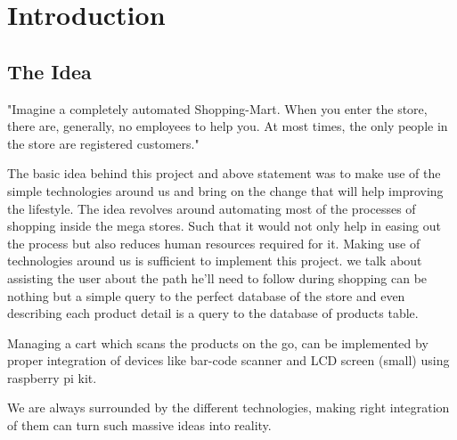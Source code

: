 \documentclass[a4paper,oneside,11pt,english]{report}
\begin{document}
\restoregeometry
\doublespacing

\tableofcontents
\listoffigures
\clearpage

\chapter{Introduction}
\section{The Idea}
{

	"Imagine a completely automated Shopping-Mart. When you enter the store, there are, generally, no employees to help you. At most times, the only people in the store are registered customers."
	\par The basic idea behind this project and above statement was to make use of the simple technologies around us and bring on the change that will help improving the lifestyle. The idea revolves around automating most of the processes of shopping inside the mega stores. Such that it would not only help in easing out the process but also reduces human resources required for it. Making use of technologies around us is sufficient to implement this project. we talk about assisting the user about the path he'll need to follow during shopping can be nothing but a simple query to the perfect database of the store and even describing each product detail is a query to the database of products table.

	\par Managing a cart which scans the products on the go, can be implemented by proper integration of devices like bar-code scanner and LCD screen (small) using raspberry pi kit.

	\par We are always surrounded by the different technologies, making right integration of them can turn such massive ideas into reality.

}
\end{document}
